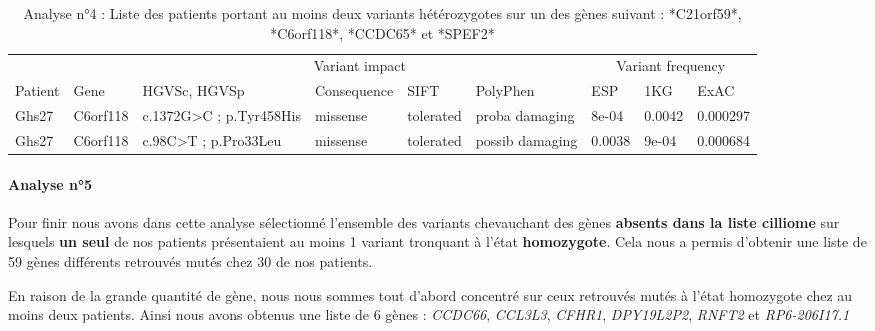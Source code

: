 \documentclass[12pt,twoside]{reedthesis}
\theoremstyle{definition}
\theoremstyle{definition}
\theoremstyle{remark}
\begin{document}
  \begin{landscape}
  \begin{longtable}[t]{lllllllll}
  \caption{\label{tab:tabgrp3low}Analyse n°4 : Liste des patients portant au moins deux variants hétérozygotes sur un des gènes suivant : *C21orf59*, *C6orf118*, *CCDC65*  et  *SPEF2*}\\
  \toprule
  \multicolumn{1}{c}{ } & \multicolumn{1}{c}{ } & \multicolumn{4}{c}{Variant impact} & \multicolumn{3}{c}{Variant frequency} \\
  \cmidrule(l{2pt}r{2pt}){3-6} \cmidrule(l{2pt}r{2pt}){7-9}
  Patient & Gene & HGVSc, HGVSp & Consequence & SIFT & PolyPhen & ESP & 1KG & ExAC\\
  \midrule
  Ghs27 & C6orf118 & c.1372G>C ; p.Tyr458His & missense & tolerated & proba damaging & 8e-04 & 0.0042 & 0.000297\\
  Ghs27 & C6orf118 & c.98C>T ; p.Pro33Leu & missense & tolerated & possib damaging & 0.0038 & 9e-04 & 0.000684\\
  \bottomrule
  \end{longtable}
  \end{landscape}
  
  \newpage
  
  \paragraph{Analyse n°5}\label{analyse-n5}
  
  Pour finir nous avons dans cette analyse sélectionné l'ensemble des
  variants chevauchant des gènes \textbf{absents dans la liste cilliome}
  sur lesquels \textbf{un seul} de nos patients présentaient au moins 1
  variant tronquant à l'état \textbf{homozygote}. Cela nous a permis
  d'obtenir une liste de 59 gènes différents retrouvés mutés chez 30 de
  nos patients.
  
  En raison de la grande quantité de gène, nous nous sommes tout d'abord
  concentré sur ceux retrouvés mutés à l'état homozygote chez au moins
  deux patients. Ainsi nous avons obtenus une liste de 6 gènes :
  \emph{CCDC66}, \emph{CCL3L3}, \emph{CFHR1}, \emph{DPY19L2P2},
  \emph{RNFT2} et \emph{RP6-206I17.1}
  
\end{document}
